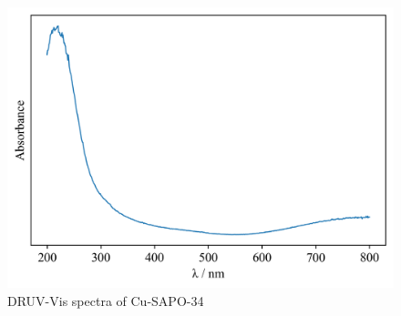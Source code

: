 \documentclass[preprint,12pt]{elsarticle}
\begin{document}
\begin{figure}
    \centering
    \includegraphics{Figures/Cu_SAPO_34_absorbance.png}
    \caption{DRUV-Vis spectra of Cu-SAPO-34}
    \label{fig:DRUV-Vis Cu-SAPO-34}
\end{figure}














\end{document}
